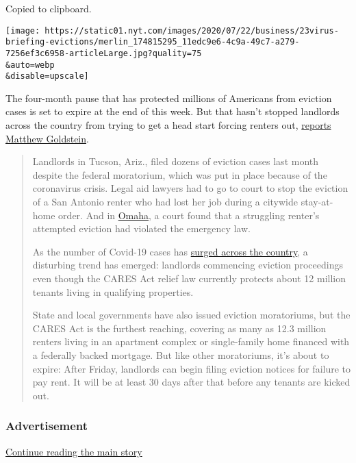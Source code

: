 Copied to clipboard.

\texttt{[image: https://static01.nyt.com/images/2020/07/22/business/23virus-briefing-evictions/merlin\_174815295\_11edc9e6-4c9a-49c7-a279-7256ef3c6958-articleLarge.jpg?quality=75\\\&auto=webp\\\&disable=upscale]}

The four-month pause that has protected millions of Americans from
eviction cases is set to expire at the end of this week. But that hasn't
stopped landlords across the country from trying to get a head start
forcing renters out,
\href{https://www.nytimes.com/2020/07/23/business/evictions-moratorium-cares-act.html}{reports
Matthew Goldstein}.

\begin{quote}
Landlords in Tucson, Ariz., filed dozens of eviction cases last month
despite the federal moratorium, which was put in place because of the
coronavirus crisis. Legal aid lawyers had to go to court to stop the
eviction of a San Antonio renter who had lost her job during a citywide
stay-at-home order. And in
\href{https://www.nhlp.org/wp-content/uploads/Douglas-County-Order-of-Dismissal.pdf}{Omaha},
a court found that a struggling renter's attempted eviction had violated
the emergency law.

As the number of Covid-19 cases has
\href{https://www.nytimes.com/interactive/2020/us/coronavirus-us-cases.html}{surged
across the country}, a disturbing trend has emerged: landlords
commencing eviction proceedings even though the CARES Act relief law
currently protects about 12 million tenants living in qualifying
properties.

State and local governments have also issued eviction moratoriums, but
the CARES Act is the furthest reaching, covering as many as 12.3 million
renters living in an apartment complex or single-family home financed
with a federally backed mortgage. But like other moratoriums, it's about
to expire: After Friday, landlords can begin filing eviction notices for
failure to pay rent. It will be at least 30 days after that before any
tenants are kicked out.
\end{quote}

\hypertarget{advertisement-3}{%
\subsubsection{Advertisement}\label{advertisement-3}}

\protect\hyperlink{after-dfp-ad-mid4}{Continue reading the main story}

